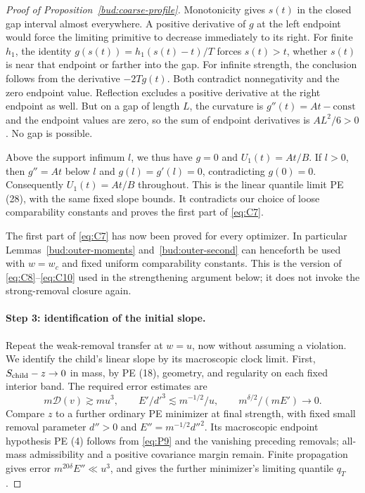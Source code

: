 \begin{proof}[Proof of Proposition~\ref{bud:coarse-profile}]
Monotonicity gives \(s(t)\) in the closed gap interval almost
everywhere. A positive derivative of \(g\) at the left endpoint
would force the limiting primitive to decrease immediately to its
right. For finite \(h_1\), the identity
\(g(s(t))=h_1(s(t)-t)/T\) forces \(s(t)>t\), whether \(s(t)\)
is near that endpoint or farther into the gap. For infinite strength,
the conclusion follows from the derivative \(-2Tg(t)\).
Both contradict nonnegativity and the zero endpoint value. Reflection
excludes a positive derivative at the right endpoint as well.
But on a gap of length \(L\), the curvature is
\(g''(t)=At-\mathrm{const}\) and the endpoint values are zero,
so the sum of endpoint derivatives is \(AL^2/6>0\).
No gap is possible.

Above the support infimum \(l\), we thus have \(g=0\) and
\(U_1(t)=At/B\). If \(l>0\), then \(g''=At\) below \(l\)
and \(g(l)=g'(l)=0\), contradicting \(g(0)=0\).
Consequently \(U_1(t)=At/B\) throughout. This is the linear quantile
limit PE (28), with the same fixed slope bounds. It contradicts our
choice of loose comparability constants and proves the first part of
\eqref{eq:C7}.

The first part of \eqref{eq:C7} has now been proved for every
optimizer. In particular Lemmas~\ref{bud:outer-moments}
and~\ref{bud:outer-second} can henceforth be used with $w=w_c$ and fixed uniform comparability constants. This is the
version of \eqref{eq:C8}--\eqref{eq:C10} used in the strengthening
argument below; it does not invoke the strong-removal closure again.

\paragraph{Step 3: identification of the initial slope.}

Repeat the weak-removal transfer at \(w=u\), now without assuming
a violation. We identify the child's linear slope by its macroscopic
clock limit. First,
\(S_{\rm child}-z\to0\) in mass, by PE (18), geometry, and
regularity on each fixed interior band. The required error estimates
are
\[
 m\mathcal D(v)\gtrsim mu^3,\qquad
 E'/d'^3\lesssim m^{-1/2}/u,\qquad
 m^{\delta/2}/(mE')\longrightarrow0.
\]
Compare \(z\) to a further ordinary PE minimizer at final strength,
with fixed small removal parameter \(d''>0\) and
\(E''=m^{-1/2}d''^2\). Its macroscopic endpoint hypothesis PE (4)
follows from \eqref{eq:P9} and the vanishing preceding removals;
all-mass admissibility and a positive covariance margin remain.
Finite propagation gives error \(m^{20\delta}E''\ll u^3\), and
\cite[Proposition~5.9]{PE} gives the further minimizer's limiting
quantile \(q_T\).


\end{proof}
